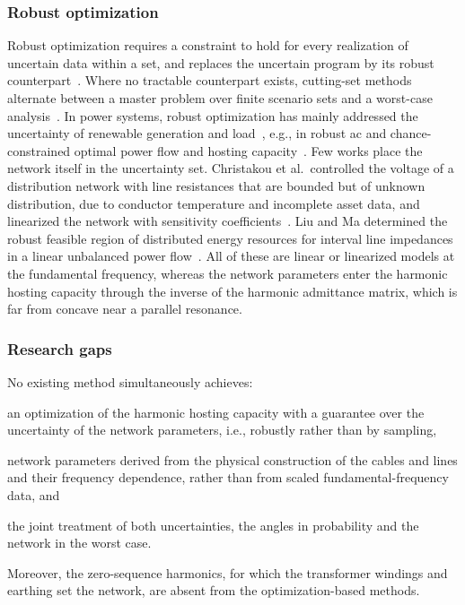 \subsubsection{Robust optimization}

Robust optimization requires a constraint to hold for every realization of uncertain data within a set, and replaces the uncertain program by its robust counterpart~\cite{ben-tal_robust_1999}. Where no tractable counterpart exists, cutting-set methods alternate between a master problem over finite scenario sets and a worst-case analysis~\cite{mutapcic_cutting-set_2009}. In power systems, robust optimization has mainly addressed the uncertainty of renewable generation and load~\cite{roald_power_2023}, e.g., in robust ac and chance-constrained optimal power flow and hosting capacity~\cite{louca_robust_2019,lee_robust_2021,lubin_robust_2016,wang_distributed_2016}. Few works place the network itself in the uncertainty set. Christakou et al.\ controlled the voltage of a distribution network with line resistances that are bounded but of unknown distribution, due to conductor temperature and incomplete asset data, and linearized the network with sensitivity coefficients~\cite{christakou_voltage_2018}. Liu and Ma determined the robust feasible region of distributed energy resources for interval line impedances in a linear unbalanced power flow~\cite{liu_feasible_2023}. All of these are linear or linearized models at the fundamental frequency, whereas the network parameters enter the harmonic hosting capacity through the inverse of the harmonic admittance matrix, which is far from concave near a parallel resonance.

\subsubsection{Research gaps}

No existing method simultaneously achieves:
\begin{enumerate*}
    \item [(i)] an optimization of the harmonic hosting capacity with a guarantee over the uncertainty of the network parameters, i.e., robustly rather than by sampling,
    \item [(ii)] network parameters derived from the physical construction of the cables and lines and their frequency dependence, rather than from scaled fundamental-frequency data, and
    \item [(iii)] the joint treatment of both uncertainties, the angles in probability and the network in the worst case.
\end{enumerate*}
Moreover, the zero-sequence harmonics, for which the transformer windings and earthing set the network, are absent from the optimization-based methods.

